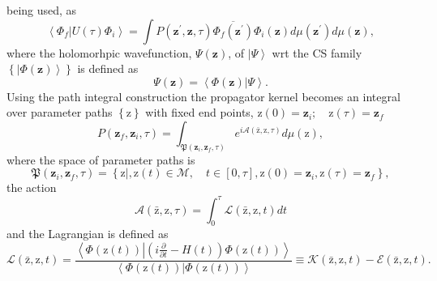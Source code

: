 \documentclass[aps,preprint]{revtex4}%
\begin{document}
being used, as
\begin{equation}
\left\langle \Phi_{f}\left\vert U\left(  \tau\right)  \right.  \Phi
_{i}\right\rangle =\int P\left(  \mathbf{z}^{\prime},\mathbf{z},\tau\right)
\overline{\Phi_{f}\left(  \mathbf{z}^{\prime}\right)  }\Phi_{i}\left(
\mathbf{z}\right)  d\mu\left(  \mathbf{z}^{\prime}\right)  d\mu\left(
\mathbf{z}\right)  ,
\end{equation}
where the holomorhpic wavefunction, $\Psi\left(  \mathbf{z}\right)  $, of
$\left\vert \Psi\right\rangle $ wrt the CS family $\left\{  \left\vert
\Phi\left(  \mathbf{z}\right)  \right\rangle \right\}  $ is defined as
\begin{equation}
\Psi\left(  \mathbf{z}\right)  =\left\langle \Phi\left(  \mathbf{z}\right)
\left\vert \Psi\right.  \right\rangle .
\end{equation}
Using the path integral construction the propagator kernel becomes an integral
over parameter paths $\left\{  \mathrm{z}\right\}  $ with fixed end points,
$\mathrm{z}\left(  0\right)  =\mathbf{z}_{i};\quad\mathrm{z}\left(
\tau\right)  =\mathbf{z}_{f}$
\begin{equation}
P\left(  \mathbf{z}_{f},\mathbf{z}_{i},\tau\right)  =\int_{\mathfrak{P}\left(
\mathbf{z}_{i},\mathbf{z}_{f},\tau\right)  }e^{i\mathcal{A}\left(
\mathrm{\bar{z}},\mathrm{z}\mathbf{,}\tau\right)  }d\mu\left(  \mathrm{z}%
\right)  , \label{p1}%
\end{equation}
where the space of parameter paths is
\begin{equation}
\mathfrak{P}\left(  \mathbf{z}_{i},\mathbf{z}_{f},\tau\right)  =\left\{
\left.  \mathrm{z}\right\vert ,\mathrm{z}\left(  t\right)  \in\mathcal{M}%
\mathfrak{,}\quad t\in\left[  0,\tau\right]  ,\mathrm{z}\left(  0\right)
=\mathbf{z}_{i},\mathrm{z}\left(  \tau\right)  =\mathbf{z}_{f}\right\}  ,
\end{equation}
the action
\begin{equation}
\mathcal{A}\left(  \mathrm{\bar{z}},\mathrm{z}\mathbf{,}\tau\right)  =\int
_{0}^{\tau}\mathcal{L}\left(  \mathrm{\bar{z}},\mathrm{z}\mathbf{,}t\right)
dt
\end{equation}
and the Lagrangian is defined as
\begin{equation}
\mathcal{L}\left(  \mathrm{\bar{z}},\mathrm{z}\mathbf{,}t\right)
=\frac{\left\langle \Phi\left(  \mathrm{z}\left(  t\right)  \right)
\left\vert \left(  i\frac{\partial}{\partial t}-H\left(  t\right)  \right)
\Phi\left(  \mathrm{z}\left(  t\right)  \right)  \right.  \right\rangle
}{\left\langle \Phi\left(  \mathrm{z}\left(  t\right)  \right)  \left\vert
\Phi\left(  \mathrm{z}\left(  t\right)  \right)  \right.  \right\rangle
}\equiv\mathcal{K}\left(  \mathrm{\bar{z}},\mathrm{z}\mathbf{,}t\right)
-\mathcal{E}\left(  \mathrm{\bar{z}},\mathrm{z}\mathbf{,}t\right)  .
\end{equation}
\end{document}
